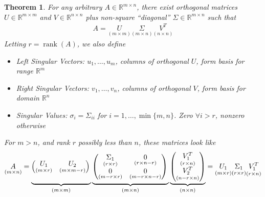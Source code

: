 \documentclass[12pt]{article}
\numberwithin{equation}{section} %
\theoremstyle{plain}
\newtheorem{thm}{Theorem}[section]
\theoremstyle{definition}
\theoremstyle{remark}
\newcommand{\Rn}{\mathbb{R}^n}
\newcommand{\Rm}{\mathbb{R}^m}
\newcommand{\Rmn}{\mathbb{R}^{m\times n}}
\newcommand{\Rmm}{\mathbb{R}^{m\times m}}
\newcommand{\Rnn}{\mathbb{R}^{n\times n}}
\newcommand{\rank}{\operatorname{rank}}
\begin{document}
\begin{thm}
For any arbitrary $A\in\Rmn$, there exist orthogonal matrices $U\in\Rmm$
and $V\in\Rnn$ plus non-square ``diagonal'' $\Sigma\in\Rmn$ such that
\begin{align*}
  A
  =
  \underset{(m\times m)}{U}
  \underset{(m\times n)}{\Sigma}
  \underset{(n\times n)}{V^T}
\end{align*}
Letting $r=\rank(A)$, we also define
\begin{itemize}
  \item \emph{Left Singular Vectors}: $u_1,\ldots,u_m$, columns of
    orthogonal $U$, form basis for range $\Rm$
  \item \emph{Right Singular Vectors}: $v_1,\ldots,v_n$, columns of
    orthogonal $V$, form basis for domain $\Rn$
  \item \emph{Singular Values}: $\sigma_i=\Sigma_{ii}$ for
    $i=1,\ldots,\min\{m,n\}$. Zero $\forall i> r$, nonzero
    otherwise
\end{itemize}
For $m>n$, and rank $r$ possibly less than $n$, these matrices look like
\begin{align}
  \underset{(m\times n)}{A}
  =
  \underbrace{%
    \begin{pmatrix}
      \underset{(m\times r)}{U_1}
      &
      \underset{(m\times m-r)}{U_2}
    \end{pmatrix}
    \vphantom{%
    \begin{pmatrix}
      \underset{(r\times n)}{V_1^T}
      \\
      \underset{(n-r\times n)}{V^T_2}
    \end{pmatrix}
    }
  }_{(m\times m)}
  \underbrace{%
    \begin{pmatrix}
      \underset{(r\times r)}{\Sigma_1}
      &
      \underset{(r\times n-r)}{0}
      \\
      \underset{(m-r\times r)}{0}
      &
      \underset{(m-r\times n-r)}{0}
    \end{pmatrix}
    \vphantom{%
    \begin{pmatrix}
      \underset{(r\times n)}{V_1^T}
      \\
      \underset{(n-r\times n)}{V^T_2}
    \end{pmatrix}
    }
  }_{(m\times n)}
  \underbrace{%
    \begin{pmatrix}
      \underset{(r\times n)}{V_1^T}
      \\
      \underset{(n-r\times n)}{V^T_2}
    \end{pmatrix}
  }_{(n\times n)}
  =
  \underset{(m\times r)}{U_1}
  \underset{(r\times r)}{\Sigma_1}
  \underset{(r\times n)}{V_1^T}
  \label{svd}
\end{align}
\end{thm}
\end{document}
